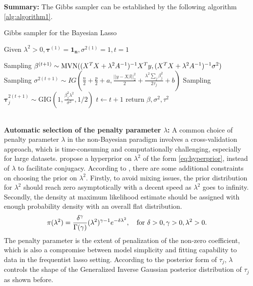 \noindent \textbf{Summary:}
The Gibbs sampler can be established by the following algorithm \autoref{alg:algorithm1}.
\begin{algorithm}
	\caption{Gibbs sampler for the Bayesian Lasso}
	\begin{algorithmic}[1]
		
		\State Given $\lambda^2>0, \mathbf{\tau}^{(1)} = \mathbf{1_n}, \sigma^{2(1)} =1 , t=1$ 
		
		\State Sampling $\mathbf{\beta}^{(t+1)} \sim \textnormal{MVN}((X^TX+\lambda^2A^{-1})^{-1}X^Ty,(X^TX+\lambda^2A^{-1})^{-1}\sigma^2) $  
		\State Sampling $\sigma^{2(t+1)} \sim IG\left(\frac{n}{2}+\frac{p}{2}+a,\frac{||y-X\beta||_2^2}{2}+\frac{\lambda^2\sum_j{\beta_j^2}}{2\tau_j}+b\right)$ 
		\State Sampling $\mathbf{\tau}_j^{2(t+1)} \sim \text{GIG}\left(1,\frac{\beta_j^2\lambda^2}{\sigma^2},1/2\right)$
		\EndFor
		\State $t \leftarrow t + 1$
		\EndWhile  \label{roy's loop}
		\State return $\beta,\sigma^2,\tau^2$
		
		
	\end{algorithmic}
	\label{alg:algorithm1}
\end{algorithm}\\
\textbf{Automatic selection of the penalty parameter $\lambda$:}
A common choice of penalty parameter $\lambda$ in the non-Bayesian paradigm involves a cross-validation approach, which is time-consuming and computationally challenging, especially for large datasets.
\cite{park_casella_2008} propose a hyperprior on $\lambda^2$ of the form \autoref{eq:hyperprior}, instead of $\lambda$ to facilitate conjugacy.
According to \cite{park_casella_2008}, there are some additional constraints on choosing the prior on $\lambda^2$. Firstly, to avoid mixing issues, the prior distribution for $\lambda^2$ should reach zero asymptotically with a decent speed as $\lambda^2 $ goes to infinity. Secondly, the density at maximum likelihood estimate should be assigned with enough probability density with an overall flat distribution.
\begin{equation}
	\label{eq:hyperprior}
	\pi(\lambda^2) = \frac{\delta^\gamma}{\Gamma(\gamma)}(\lambda^2)^{\gamma-1}e^{-\delta\lambda^2}, \quad \textnormal{for } \delta>0, \gamma>0, \lambda^2>0.
\end{equation}
\noindent The penalty parameter is the extent of penalization of the non-zero coefficient, which is also a compromise between model simplicity and fitting capability to data in the frequentist lasso setting. According to the posterior form of $\tau_j$, $\lambda$ controls the shape of the Generalized Inverse Gaussian posterior distribution of $\tau_j$ as shown before.

